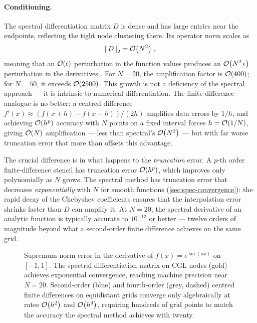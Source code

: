 \paragraph{Conditioning.}

The spectral differentiation matrix $D$ is dense and has large
entries near the endpoints, reflecting the tight node clustering
there.  Its operator norm scales as
%
\begin{equation}
  \left\lVert D \right\rVert_2 = \mathcal{O}\!\left(N^2\right) \,,
  \label{eq:diffmat-norm}
\end{equation}
%
meaning that an $\mathcal{O}\!\left(\epsilon\right)$ perturbation in the function values
produces an $\mathcal{O}\!\left(N^2\,\epsilon\right)$ perturbation in the
derivatives \cite{Trefethen2000}.  For $N = 20$, the amplification
factor is $\mathcal{O}\!\left(400\right)$; for $N = 50$, it exceeds $\mathcal{O}\!\left(2500\right)$.
This growth is not a deficiency of the spectral approach --- it is
intrinsic to numerical differentiation.  The finite-difference
analogue is no better: a centred difference
$f'(x) \approx (f(x+h) - f(x-h))/(2h)$ amplifies data errors by
$1/h$, and achieving $\mathcal{O}\!\left(h^p\right)$ accuracy with $N$ points on a
fixed interval forces $h = \mathcal{O}\!\left(1/N\right)$, giving $\mathcal{O}\!\left(N\right)$
amplification --- less than spectral's $\mathcal{O}\!\left(N^2\right)$ --- but with
far worse truncation error that more than offsets this advantage.

The crucial difference is in what happens to the \emph{truncation}
error.  A $p$-th order finite-difference stencil has truncation
error $\mathcal{O}\!\left(h^p\right)$, which improves only polynomially as $N$
grows.  The spectral method has truncation error that decreases
\emph{exponentially} with $N$ for smooth functions
(\cref{sec:spec-convergence}): the rapid decay of the Chebyshev
coefficients ensures that the interpolation error shrinks faster
than $D$ can amplify it.  At $N = 20$, the spectral derivative of an
analytic function is typically accurate to $10^{-12}$ or
better --- twelve orders of magnitude beyond what a second-order
finite difference achieves on the same grid.

\begin{figure}[htbp]
  \centering
  
  \caption[Spectral vs.\ finite-difference differentiation convergence]{%
    Supremum-norm error in the derivative of
    $f(x) = e^{\sin(\pi x)}$ on $[-1,1]$.  The spectral
    differentiation matrix on CGL nodes (gold) achieves exponential
    convergence, reaching machine precision near $N = 20$.
    Second-order (blue) and fourth-order (grey, dashed) centred
    finite differences on equidistant grids converge only
    algebraically at rates $\mathcal{O}\!\left(h^2\right)$ and $\mathcal{O}\!\left(h^4\right)$,
    requiring hundreds of grid points to match the accuracy the
    spectral method achieves with twenty.}
  \label{fig:diffmat-convergence}
\end{figure}

